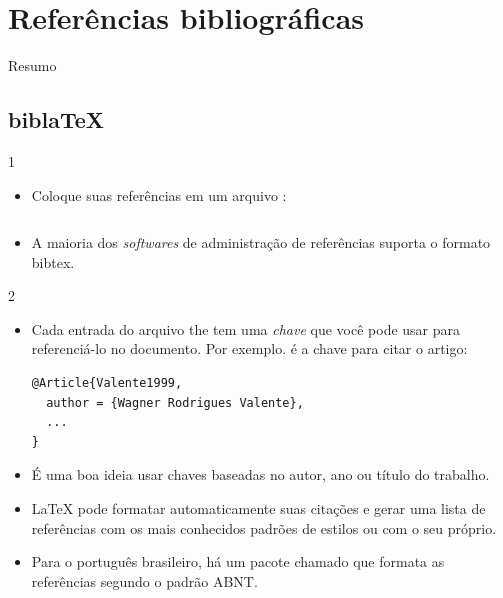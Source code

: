 \documentclass{beamer}
\begin{document}
\section{Referências bibliográficas}

\begin{frame}{Resumo}
\begin{multicols}{2}
\tableofcontents[currentsection]
\end{multicols}
\end{frame}
 
\subsection{bibla\TeX}
\begin{frame}[fragile]{\insertsubsection{} 1} 
\begin{itemize}
\item Coloque suas referências em um arquivo  :
\inputminted[fontsize=\scriptsize,frame=single]{latex}{bib-example.bib}
\item A maioria dos \emph{softwares} de administração de referências suporta o formato
bibtex.
\end{itemize}
\end{frame}

\begin{frame}[fragile]{\insertsubsection{} 2}
\begin{itemize}
\item Cada entrada do arquivo the  tem uma \emph{chave} que você pode
usar para referenciá-lo no documento. Por exemplo.   é
a chave para citar o artigo:
\begin{verbatim}
@Article{Valente1999,
  author = {Wagner Rodrigues Valente},
  ...
}
\end{verbatim} 
\item É uma boa ideia usar chaves baseadas no autor, ano ou título do trabalho.
\item \LaTeX{} pode formatar automaticamente suas citações e gerar uma lista de
referências com os mais conhecidos padrões de estilos ou com o seu próprio.
\item Para o português brasileiro, há um pacote chamado 
\href{http://www.abntex.net.br/}{} que
formata as referências segundo o padrão ABNT. 
\end{itemize}
\end{frame}
\end{document}
